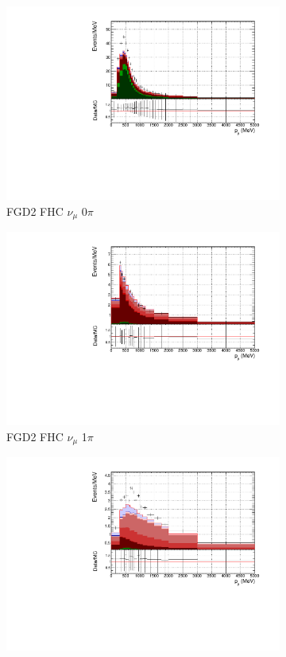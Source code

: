 \begin{figure}
\begin{subfigure}{.32\textwidth}
  \includegraphics[width=0.95\linewidth]{figs/FGD2_numuCC_0pi_p}
  \caption{FGD2 FHC $\nu_{\mu}$ 0$\pi$}
  \label{fig:pstack_FGD2_numuCC_0pi}
\end{subfigure}
\begin{subfigure}{.32\textwidth}
  \centering
  \includegraphics[width=0.95\linewidth]{figs/FGD2_numuCC_1pi_p}
  \caption{FGD2 FHC $\nu_{\mu}$ 1$\pi$}
  \label{fig:pstack_FGD2_numuCC_1pi}
\end{subfigure}
\begin{subfigure}{.32\textwidth}
  \centering
  \includegraphics[width=0.95\linewidth]{figs/FGD2_numuCC_other_p}

\end{subfigure}
\end{figure}
